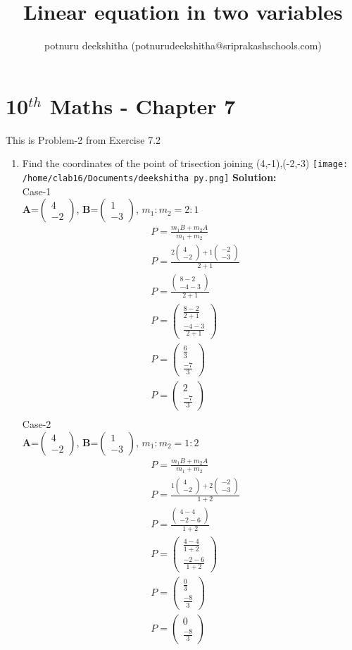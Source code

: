 \documentclass[12pt]{article}
\title{Linear equation in two variables}
\author{potnuru deekshitha (potnurudeekshitha@sriprakashschools.com)}
\newcommand{\myvec}[1]{\ensuremath{\begin{pmatrix}#1\end{pmatrix}}}
\newcommand{\solution}{\noindent \textbf{Solution: }}
\let\vec\mathbf
\begin{document}
\maketitle
\section*{10$^{th}$ Maths - Chapter 7}
This is Problem-2 from Exercise 7.2
\begin{enumerate}
\item Find the coordinates of the point of trisection joining (4,-1),(-2,-3)
\texttt{[image: /home/clab16/Documents/deekshitha py.png]}
\solution\\
Case-1\\
$\vec{A}$=\myvec{4\\-2}, $\vec{B}$=\myvec{1\\-3},
$m_1:m_2=2:1$
\begin{align}
&P=\frac{m_1B+m_2A}{m_1+m_2}\\
&P=\frac{2\myvec{4\\-2}+1\myvec{-2\\-3}}{2+1}\\
&P=\frac{\myvec{8-2\\-4-3}}{2+1}\\
&P=\myvec{\frac{8-2}{2+1}\\\frac{-4-3}{2+1}}\\
&P=\myvec{\frac{6}{3}\\\frac{-7}{3}}\\
&P=\myvec{2\\\frac{-7}{3}}\\
\end{align}
Case-2\\
$\vec{A}$=\myvec{4\\-2}, $\vec{B}$=\myvec{1\\-3},
$m_1:m_2=1:2$
\begin{align}
&P=\frac{m_1B+m_2A}{m_1+m_2}\\
&P=\frac{1\myvec{4\\-2}+2\myvec{-2\\-3}}{1+2}\\
&P=\frac{\myvec{4-4\\-2-6}}{1+2}\\
&P=\myvec{\frac{4-4}{1+2}\\\frac{-2-6}{1+2}}\\
&P=\myvec{\frac{0}{3}\\\frac{-8}{3}}\\
&P=\myvec{0\\\frac{-8}{3}}\\
\end{align}
\end{enumerate}
\end{document}
